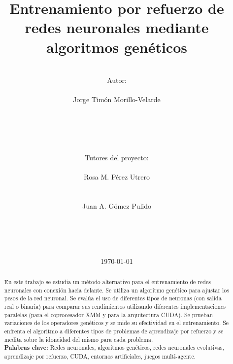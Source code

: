 \documentclass[11pt]{article}
\begin{document}
\begin{titlepage}

\title{Entrenamiento por refuerzo de redes neuronales mediante algoritmos gen\'eticos}
\newline
\newline
\newline

\author{
\\ Autor:\\
\\ Jorge Tim\'on Morillo-Velarde \\ \mail
\\ \\ \\ \\
\\ Tutores del proyecto:\\ 
\\ Rosa M. P\'erez Utrero \\ 
\\ 
\\ Juan A. G\'omez Pulido \\ 
\\ \\ \\ \\
}

\date{\today}

\maketitle
\newpage

\begin{abstract}

En este trabajo se estudia un m\'etodo alternativo para el entrenamiento de redes neuronales con conexi\'on hacia delante. Se utiliza un algoritmo gen\'etico para ajustar los pesos de la red neuronal. Se eval\'ua el uso de diferentes tipos de neuronas (con salida real o binaria) para comparar sus rendimientos utilizando diferentes implementaciones paralelas (para el coprocesador XMM y para la arquitectura CUDA). Se prueban variaciones de los operadores gen\'eticos y se mide su efectividad en el entrenamiento. Se enfrenta el algoritmo a diferentes tipos de problemas de aprendizaje por refuerzo y se medita sobre la idoneidad del mismo para cada problema.
\\

\textbf{Palabras clave:} Redes neuronales, algoritmos gen\'eticos, redes neuronales evolutivas, aprendizaje por refuerzo, CUDA, entornos artificiales, juegos multi-agente.


\end{abstract}
\end{titlepage}
\end{document}
